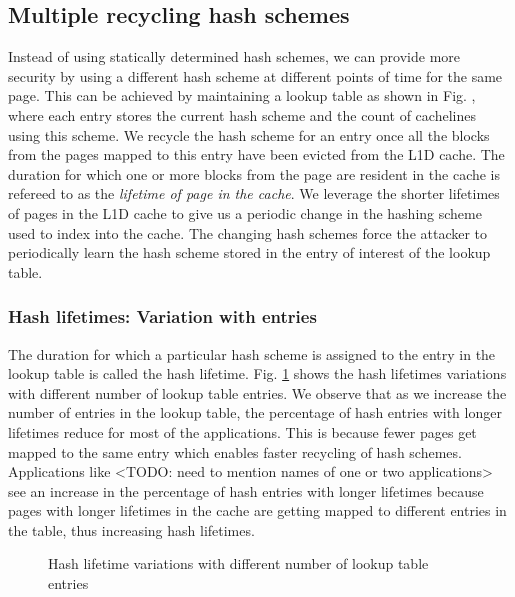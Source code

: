 \subsection{Multiple recycling hash schemes}
Instead of using statically determined hash schemes, we can provide more security by using a different hash scheme at different points of time for the same page. This can be achieved by maintaining a lookup table as shown in Fig. \cite{figure:changing_schemes}, where each entry stores the current hash scheme and the count of cachelines using this scheme. We recycle the hash scheme for an entry once all the blocks from the pages mapped to this entry have been evicted from the L1D cache. The duration for which one or more blocks from the page are resident in the cache is refereed to as the \textit{lifetime of page in the cache}. We leverage the shorter lifetimes of pages in the L1D cache to give us a periodic change in the hashing scheme used to index into the cache. The changing hash schemes force the attacker to periodically learn the hash scheme stored in the entry of interest of the lookup table.

\subsubsection{Hash lifetimes: Variation with entries}
The duration for which a particular hash scheme is assigned to the entry in the lookup table is called the hash lifetime. Fig. \ref{figure:Hash_lifetime} shows the hash lifetimes variations with different number of lookup table entries. We observe that as we increase the number of entries in the lookup table, the percentage of hash entries with longer lifetimes reduce for most of the applications. This is because fewer pages get mapped to the same entry which enables faster recycling of hash schemes. Applications like <TODO: need to mention names of one or two applications> see an increase in the percentage of hash entries with longer lifetimes because pages with longer lifetimes in the cache are getting mapped to different entries in the table, thus increasing hash lifetimes.
\begin{figure}
  \caption{Hash lifetime variations with different number of lookup table entries}
  \label{figure:Hash_lifetime}
\end{figure}

